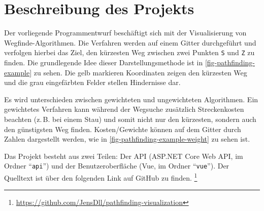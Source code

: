 \part{Beschreibung des Projekts}
Der vorliegende Programmentwurf beschäftigt sich mit der
Visualisierung von Wegfinde-Algo\-rithmen.
Die Verfahren werden auf einem Gitter durchgeführt und
verfolgen hierbei das Ziel, den kürzesten Weg zwischen zwei Punkten
\texttt{S} und \texttt{Z} zu finden.
Die grundlegende Idee dieser Darstellungsmethode ist in
\autoref{fig-pathfinding-example} zu sehen.
Die gelb markieren Koordinaten zeigen den kürzesten Weg und die
grau eingefärbten Felder stellen Hindernisse dar.



\noindent
Es wird unterschieden zwischen gewichteten und ungewichteten
Algorithmen. Ein gewichtetes Verfahren kann während der Wegsuche zusätzlich
Streckenkosten beachten (z.\,B. bei einem Stau)
und somit nicht nur den kürzesten, sondern
auch den günstigsten Weg finden. Kosten/Gewichte können auf dem Gitter durch
Zahlen dargestellt werden, wie in \autoref{fig-pathfinding-example-weight}
zu sehen ist.



\noindent
Das Projekt besteht aus zwei Teilen: Der API
(ASP.NET Core Web API, im Ordner \enquote{\texttt{api}}) und der Benutzeroberfläche
(Vue, im Ordner \enquote{\texttt{vue}}). Der Quelltext
ist über den folgenden Link auf GitHub zu finden.
\footnote{\url{https://github.com/JensDll/pathfinding-visualization}}